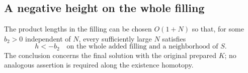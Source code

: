 \subsection{A negative height on the whole filling}

\begin{lemma}\label{lem:height:ramp}
The product lengths in the filling can be chosen $O(1+N)$ so that, for
some $b_2>0$ independent of $N$, every sufficiently large $N$ satisfies
\begin{equation}\label{eq:height:negative-core}
 h<-b_2
 \quad\text{on the whole added filling and a neighborhood of }S.
\end{equation}
The conclusion concerns the final solution with the original prepared
$K$; no analogous assertion is required along the existence homotopy.
\end{lemma}

